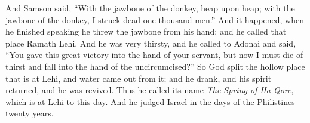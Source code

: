 \begin{biblechapter}
\verse And Samson said, “With the jawbone of the donkey, 
heap upon heap; 
with the jawbone of the donkey, 
I struck dead one thousand men.”
\verse And it happened, when he finished speaking he threw the jawbone from his hand; and he called that place Ramath Lehi.
\verse And he was very thirsty, and he called to Adonai and said, “You gave this great victory into the hand of your servant, but now I must die of thirst and fall into the hand of the uncircumcised?”
\verse So God split the hollow place that is at Lehi, and water came out from it; and he drank, and his spirit returned, and he was revived. Thus he called its name \textit{The Spring of Ha-Qore}, which is at Lehi to this day.
\verse And he judged Israel in the days of the Philistines twenty years.
\end{biblechapter}

